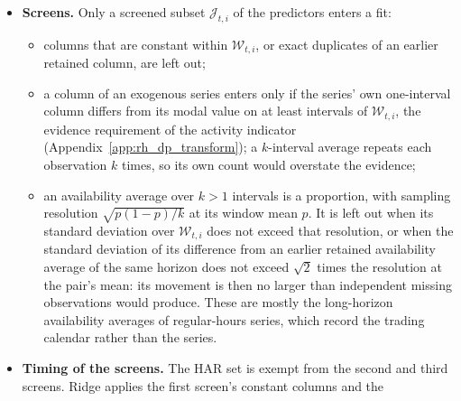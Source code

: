 \begin{itemize}
  contribution to the forecast would scale with $1/s_j^2$ for ridge and $1/s_j$ for the lasso, so that columns with
  little spread, such as long-horizon averages, would be penalized far more heavily for no economic reason. The robust
  standardization of Section~\ref{sec:rh_predictors} does not achieve this: it equalizes interquartile ranges rather
  than variances, and its scale factors are not those of the estimation window. For ridge, $m_j$ and $s_j$ are those
  of the current window at every bar; for the lasso and the elastic net they are recomputed at every cold solve of the
  homotopy below and held fixed in between. Solving in standardized coordinates gives the same estimates as penalizing
  the raw columns with weights $\omega_j s_j$ ($\ell_1$) and $\omega_j s_j^2$ ($\ell_2$), and keeps the systems the
  solvers work on well conditioned.
\item \textbf{Screens.} Only a screened subset $\mathcal J_{t,i}$ of the predictors enters a fit:
  \begin{itemize}
  \item columns that are constant within $\mathcal W_{t,i}$, or exact duplicates of an earlier retained column, are
    left out;
  \item a column of an exogenous series enters only if the series' own one-interval column differs from its modal
    value on at least \rhdmModeMinPrints{} intervals of $\mathcal W_{t,i}$, the evidence requirement of the activity
    indicator (Appendix~\ref{app:rh_dp_transform}); a $k$-interval average repeats each observation $k$ times, so its own
    count would overstate the evidence;
  \item an availability average over $k > 1$ intervals is a proportion, with sampling resolution $\sqrt{p(1-p)/k}$
    at its window mean $p$. It is left out when its standard deviation over $\mathcal W_{t,i}$ does not exceed that
    resolution, or when the standard deviation of its difference from an earlier retained availability average of the
    same horizon does not exceed $\sqrt 2$ times the resolution at the pair's mean: its movement is then no larger than
    independent missing observations would produce. These are mostly the long-horizon availability averages of
    regular-hours series, which record the trading calendar rather than the series.
  \end{itemize}
\item \textbf{Timing of the screens.} The HAR set is exempt from the second and third screens. Ridge applies the first screen's constant columns and the

\end{itemize}
